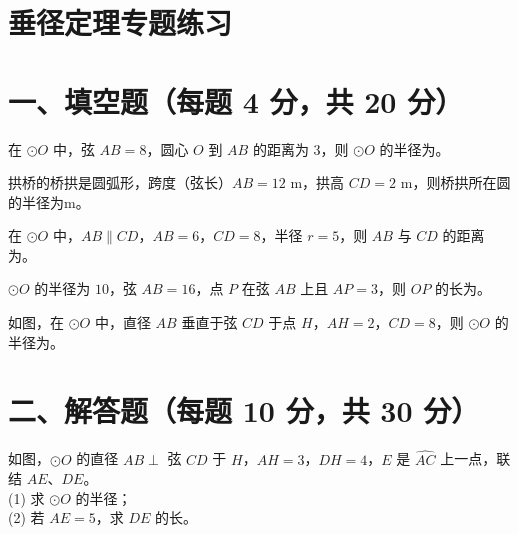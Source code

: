 \documentclass{exam-zh}
\newcommand{\answerarea}[1][40mm]{%
  \vspace{2mm}%
  \begin{tcolorbox}[
    enhanced, breakable,
    colback=white,
    colframe=white,
    boxrule=0pt,
    height=#1,
    valign=top,
    bottom=0mm,
    after skip=0mm,
  ]
  \end{tcolorbox}%
}
\begin{document}
\section*{垂径定理专题练习}

\section*{一、填空题（每题 4 分，共 20 分）}


\begin{question}[points=4]
  在 $\odot O$ 中，弦 $AB = 8$，圆心 $O$ 到 $AB$ 的距离为 $3$，则 $\odot O$ 的半径为\fillin。
  \fillin
\end{question}



\begin{question}[points=4]
  拱桥的桥拱是圆弧形，跨度（弦长）$AB = 12$ m，拱高 $CD = 2$ m，则桥拱所在圆的半径为\fillin m。
  \fillin
\end{question}



\begin{question}[points=4]
  在 $\odot O$ 中，$AB \parallel CD$，$AB = 6$，$CD = 8$，半径 $r = 5$，则 $AB$ 与 $CD$ 的距离为\fillin。
  \fillin
\end{question}



\begin{question}[points=4]
  $\odot O$ 的半径为 $10$，弦 $AB = 16$，点 $P$ 在弦 $AB$ 上且 $AP = 3$，则 $OP$ 的长为\fillin。
  \fillin
\end{question}



\begin{question}[points=4]
  如图，在 $\odot O$ 中，直径 $AB$ 垂直于弦 $CD$ 于点 $H$，$AH = 2$，$CD = 8$，则 $\odot O$ 的半径为\fillin。
  \fillin
\end{question}


\section*{二、解答题（每题 10 分，共 30 分）}


\begin{problem}[points=10]
  如图，$\odot O$ 的直径 $AB \perp$ 弦 $CD$ 于 $H$，$AH = 3$，$DH = 4$，$E$ 是 $\widehat{AC}$ 上一点，联结 $AE$、$DE$。\\
(1) 求 $\odot O$ 的半径；\\
(2) 若 $AE = 5$，求 $DE$ 的长。

  \answerarea[80mm]
\end{problem}
\end{document}
